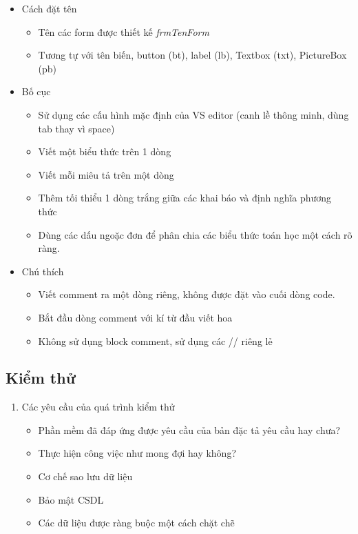 \documentclass{article}
\begin{document}
				\begin{itemize}
					\item Cách đặt tên
					
						\begin{itemize}
							\item Tên các form được thiết kế \textit{frmTenForm}
							\item Tương tự với tên biến, button (bt), label (lb), Textbox (txt), PictureBox (pb)
						\end{itemize}
					\newpage
					\item Bố cục
					
						\begin{itemize}
							\item Sử dụng các cấu hình mặc định của VS editor (canh lề thông minh, dùng tab thay vì space)
							\item Viết một biểu thức trên 1 dòng
							\item Viết mỗi miêu tả trên một dòng
							\item Thêm tối thiểu 1 dòng trắng giữa các khai báo và định nghĩa phương thức 
							\item Dùng các dấu ngoặc đơn để phân chia các biểu thức toán học một cách rõ ràng.
						\end{itemize}
					
					\item Chú thích
					
						\begin{itemize}
							\item Viết comment ra một dòng riêng, không được đặt vào cuối dòng code.
							\item Bắt đầu dòng comment với kí từ đầu viết hoa
							\item Không sử dụng block comment, sử dụng các // riêng lẻ
						\end{itemize}
				\end{itemize}
			
			\subsection{Kiểm thử}
			
				\begin{enumerate}
					\item Các yêu cầu của quá trình kiểm thử
					
						\begin{itemize}
							\item Phần mềm đã đáp ứng được yêu cầu của bản đặc tả yêu cầu hay chưa?
							\item Thực hiện công việc như mong đợi hay không?
							\item Cơ chế sao lưu dữ liệu
							\item Bảo mật CSDL
							\item Các dữ liệu được ràng buộc một cách chặt chẽ
						\end{itemize}
					
				\end{enumerate}
		
\end{document}
